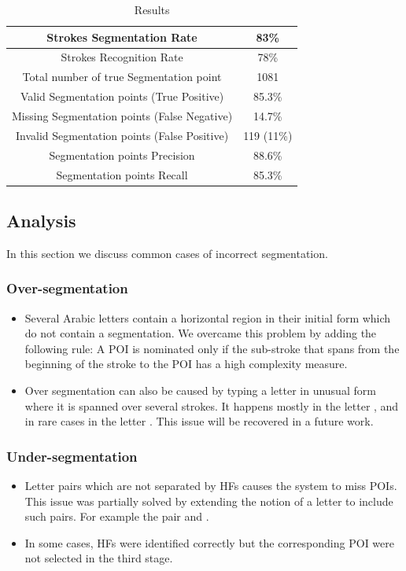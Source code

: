 \documentclass[10pt, conference, compsocconf]{IEEEtran}
\begin{document}
\begin{table}[h]
\caption{Results}
\renewcommand{\arraystretch}{1.2}
\begin{tabular}{ | c | c | }
  \hline
  Strokes Segmentation Rate &  83\% \\ 
  \hline
  Strokes Recognition Rate &  78\% \\ 
 \hline
  Total number of true Segmentation point & 1081 \\
  \hline
  Valid Segmentation points (True Positive) & 85.3\% \\
    \hline
  Missing Segmentation points (False Negative) & 14.7\% \\
  \hline
  Invalid Segmentation points (False Positive) & 119 (11\%) \\
  \hline                                    
  Segmentation points Precision & 88.6\% \\ 
 \hline
  Segmentation points Recall &  85.3\% \\ 
 \hline
\end{tabular}
\centering
\label{table:results} 
\end{table}

\subsection{Analysis}
In this section we discuss common cases of incorrect segmentation.
\subsubsection{Over-segmentation}
\begin{itemize}
\item Several Arabic letters contain a horizontal region in their initial form which do not contain a segmentation. We overcame this problem by adding the following rule: A POI is nominated only if the sub-stroke that spans from the beginning of the stroke to the POI has a high complexity measure.
\item Over segmentation can also be caused by typing a letter in unusual form where it is spanned over several strokes. 
It happens mostly in the letter ,  and in rare cases in the letter . This issue will be recovered in a future work.\\
\end{itemize}

\subsubsection{Under-segmentation}
\begin{itemize}
\item Letter pairs which are not separated by HFs causes the system to miss POIs. This issue was partially solved by extending the notion of a letter to include such pairs. For example the pair  and .
\item In some cases, HFs were identified correctly but the corresponding POI were not selected in the third stage. \\
\end{itemize}
\end{document}
